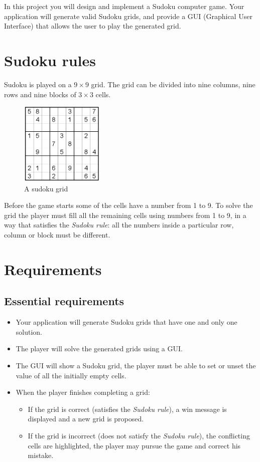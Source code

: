 \documentclass{exercices}
\renewcommand{\|}{\url|}
\begin{document}

In this project you will design and implement a Sudoku computer game.
Your application will generate valid Sudoku grids, and provide a GUI
(Graphical User Interface) that allows the user to play the generated 
grid. 

\section{Sudoku rules}

Sudoku is played on a $9\times 9$ grid. The grid can be divided into 
nine columns, nine rows and nine blocks of $3\times 3$ cells.
\begin{figure}[h]
\begin{center}
\includegraphics[width=150px]{sudoku_grid}
\end{center}
\caption{A sudoku grid}
\end{figure}

Before the game starts some of the cells have a number from 1 to 9.
To solve the grid the player must fill all the remaining cells using 
numbers from 1 to 9, in a way that satisfies the \emph{Sudoku rule}: 
all the numbers inside a particular row, column or block must be different.

\section{Requirements}

\subsection{Essential requirements}

\begin{itemize}
\item Your application will generate Sudoku grids that have one and only one
  solution.
\item The player will solve the generated grids using a GUI.
\item The GUI will show a Sudoku grid, the player must be able to set or unset
  the value of all the initially empty cells.
\item When the player finishes completing a grid:
  \begin{itemize}
    \item If the grid is correct (satisfies the \emph{Sudoku rule}), a win message is displayed and a new grid is
      proposed.
    \item If the grid is incorrect (does not satisfy the \emph{Sudoku rule}),
      the conflicting cells are highlighted, the player may pursue the game and
      correct his mistake.
  \end{itemize}
\end{itemize}
\end{document}
